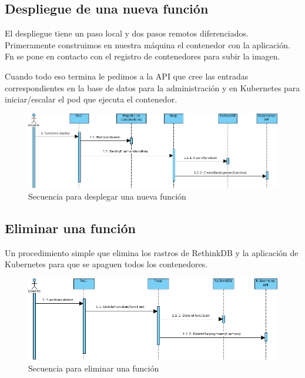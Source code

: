 \subsection{Despliegue de una nueva función}

El despliegue tiene un paso local y dos pasos remotos diferenciados. Primeramente construimos en nuestra máquina el contenedor con la aplicación. Fn se pone en contacto con el registro de contenedores para subir la imagen.

Cuando todo eso termina le pedimos a la API que cree las entradas correspondientes en la base de datos para la administración y en Kubernetes para iniciar/escalar el pod que ejecuta el contenedor.

\begin{figure}[H]
    \centering
    \includegraphics[width=\textwidth]{../images/secuencia/deploy.png}
    \caption{Secuencia para desplegar una nueva función}
\end{figure}

\subsection{Eliminar una función}

Un procedimiento simple que elimina los rastros de RethinkDB y la aplicación de Kubernetes para que se apaguen todos los contenedores.

\begin{figure}[H]
    \centering
    \includegraphics[width=\textwidth]{../images/secuencia/delete.png}
    \caption{Secuencia para eliminar una función}
\end{figure}

